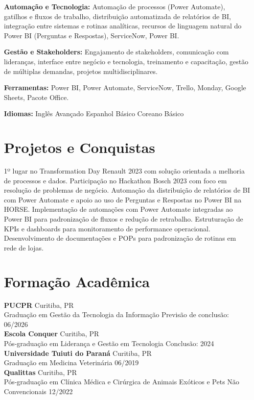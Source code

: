 \documentclass[11pt,a4paper]{article}
\begin{document}
\textbf{Automação e Tecnologia:} Automação de processos (Power Automate), gatilhos e fluxos de trabalho, distribuição automatizada de relatórios de BI, integração entre sistemas e rotinas analíticas, recursos de linguagem natural do Power BI (Perguntas e Respostas), ServiceNow, Power BI.

\textbf{Gestão e Stakeholders:} Engajamento de stakeholders, comunicação com lideranças, interface entre negócio e tecnologia, treinamento e capacitação, gestão de múltiplas demandas, projetos multidisciplinares.

\textbf{Ferramentas:} Power BI, Power Automate, ServiceNow, Trello, Monday, Google Sheets, Pacote Office.

\textbf{Idiomas:} Inglês Avançado \enspace\textbullet\enspace Espanhol Básico \enspace\textbullet\enspace Coreano Básico

\section{Projetos e Conquistas}

1º lugar no Transformation Day Renault 2023 com solução orientada a melhoria de processos e dados. Participação no Hackathon Bosch 2023 com foco em resolução de problemas de negócio. Automação da distribuição de relatórios de BI com Power Automate e apoio ao uso de Perguntas e Respostas no Power BI na HORSE. Implementação de automações com Power Automate integradas ao Power BI para padronização de fluxos e redução de retrabalho. Estruturação de KPIs e dashboards para monitoramento de performance operacional. Desenvolvimento de documentações e POPs para padronização de rotinas em rede de lojas.

\section{Formação Acadêmica}

\textbf{PUCPR} \hfill Curitiba, PR\\
Graduação em Gestão da Tecnologia da Informação \hfill Previsão de conclusão: 06/2026\\[6pt]

\textbf{Escola Conquer} \hfill Curitiba, PR\\
Pós-graduação em Liderança e Gestão em Tecnologia \hfill Conclusão: 2024\\[6pt]

\textbf{Universidade Tuiuti do Paraná} \hfill Curitiba, PR\\
Graduação em Medicina Veterinária \hfill 06/2019\\[6pt]

\textbf{Qualittas} \hfill Curitiba, PR\\
Pós-graduação em Clínica Médica e Cirúrgica de Animais Exóticos e Pets Não Convencionais \hfill 12/2022
\end{document}
